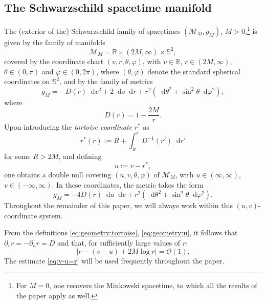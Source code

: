 \documentclass[11pt,english]{article}
\numberwithin{equation}{section}
\theoremstyle{remark}
\theoremstyle{plain}
\theoremstyle{remark}
\newcommand{\dd}{\mathop{}\!\mathrm{d}}
\newcommand{\pu}{\partial_u}
\newcommand{\pv}{\partial_v}
\renewcommand{\(}{\left(}
\renewcommand{\)}{\right)}
\begin{document}
\subsection{The Schwarzschild spacetime manifold}
The (exterior of the) Schwarzschild family of spacetimes $(\mathcal{M}_M,g_M)$, $M>0$,\footnote{For $M=0$, one recovers the Minkowski spacetime, to which all the results of the paper apply as well.} is given by the family of manifolds
\begin{equation*}
\mathcal{M}_M=\mathbb{R}\times(2M, \infty)\times \mathbb{S}^2,
\end{equation*}
covered by the coordinate chart $(v,r,\theta, \varphi)$, with $v\in\mathbb{R}$, $r\in(2M,\infty)$, $\theta\in(0,\pi)$ and $\varphi\in(0,2\pi)$, where $(\theta,\varphi)$ denote the standard spherical coordinates on $\mathbb{S}^2$, and by the family of metrics
\begin{equation}\label{eq:geometry:vr}
g_M=-D(r)\dd v^2+2\dd v\dd r+r^2(\dd\theta^2+\sin^2\theta \dd\varphi^2),
\end{equation}
where 
\begin{equation}\label{eq:geometry:D}
D(r)=1-\frac{2M}{r}.
\end{equation}
Upon introducing the \textit{tortoise coordinate} $r^*$ as
\begin{equation}\label{eq:geometry:tortoise}
r^*(r):=R+\int_R^r D^{-1}(r')\dd r'
\end{equation}
for some $R>2M$, and defining 
\begin{equation}\label{eq:geometry:u}
u:=v-r^*,
\end{equation}
one obtains a double null covering  $(u,v,\theta,\varphi)$ of $\mathcal{M}_M$, with $u\in(\infty, \infty)$, $v\in(-\infty, \infty)$. 
In these coordinates, the metric takes the form 
\begin{equation}\label{eq:geometry:null}
g_M=-4D(r)\dd u\dd v+r^2(\dd\theta^2+\sin^2\theta \dd\varphi^2).
\end{equation}
Throughout the remainder of this paper, we will always work within this $(u,v)$-coordinate system.

From the definitions \eqref{eq:geometry:tortoise}, \eqref{eq:geometry:u}, it follows that $\pv r=-\pu r=D$ and that, for sufficiently large values of $r$:
\begin{equation}\label{eq:v-u=r}
|r-(v-u)+2M\log r|=\mathcal{O}(1).
\end{equation}
The estimate \eqref{eq:v-u=r} will be used frequently throughout the paper.
\end{document}
